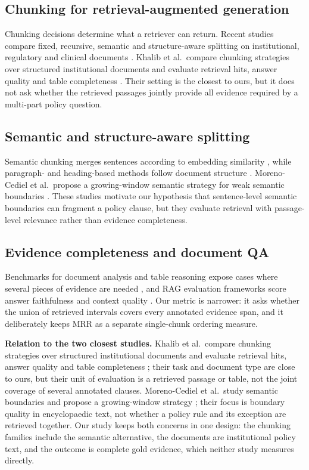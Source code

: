 \documentclass[conference]{IEEEtran}
\begin{document}
\subsection{Chunking for retrieval-augmented generation}
Chunking decisions determine what a retriever can return. Recent studies compare fixed, recursive, semantic and structure-aware splitting on institutional, regulatory and clinical documents \cite{fadillah2024chunking,gomez2025chunking,khalib2026chunking}. Khalib et al.\ compare chunking strategies over structured institutional documents and evaluate retrieval hits, answer quality and table completeness \cite{khalib2026chunking}. Their setting is the closest to ours, but it does not ask whether the retrieved passages jointly provide all evidence required by a multi-part policy question.

\subsection{Semantic and structure-aware splitting}
Semantic chunking merges sentences according to embedding similarity \cite{kiss2025maxmin,moreno2026growing}, while paragraph- and heading-based methods follow document structure \cite{mazzitelli2025paragraph}. Moreno-Cediel et al.\ propose a growing-window semantic strategy for weak semantic boundaries \cite{moreno2026growing}. These studies motivate our hypothesis that sentence-level semantic boundaries can fragment a policy clause, but they evaluate retrieval with passage-level relevance rather than evidence completeness.

\subsection{Evidence completeness and document QA}
Benchmarks for document analysis and table reasoning expose cases where several pieces of evidence are needed \cite{hui2024uda,yu2025tablerag}, and RAG evaluation frameworks score answer faithfulness and context quality \cite{es2024ragas,wang2024bestpractices}. Our metric is narrower: it asks whether the union of retrieved intervals covers every annotated evidence span, and it deliberately keeps MRR as a separate single-chunk ordering measure.

\textbf{Relation to the two closest studies.}
Khalib et al.\ compare chunking strategies over structured institutional documents and evaluate retrieval hits, answer quality and table completeness \cite{khalib2026chunking}; their task and document type are close to ours, but their unit of evaluation is a retrieved passage or table, not the joint coverage of several annotated clauses. Moreno-Cediel et al.\ study semantic boundaries and propose a growing-window strategy \cite{moreno2026growing}; their focus is boundary quality in encyclopaedic text, not whether a policy rule and its exception are retrieved together. Our study keeps both concerns in one design: the chunking families include the semantic alternative, the documents are institutional policy text, and the outcome is complete gold evidence, which neither study measures directly.
\end{document}
